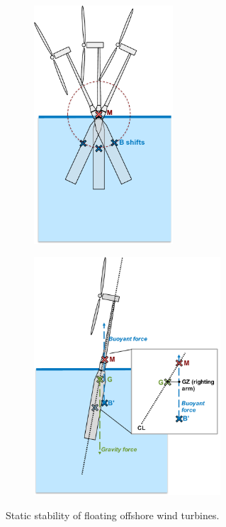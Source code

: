\begin{figure}
\begin{subfigure}[b]{0.49\linewidth}
    \caption{}
  \end{subfigure}\\
  \begin{subfigure}[b]{0.49\linewidth}
    \centering \includegraphics[height=3.5in]{figs/metacenterC}
    \caption{}
  \end{subfigure}
  \begin{subfigure}[b]{0.49\linewidth}
    \centering \includegraphics[height=3.5in]{figs/metacenterD}
    \caption{}
  \end{subfigure}
  \caption{Static stability of floating offshore wind turbines.}
  \label{fig:metacenter}
\end{figure}


